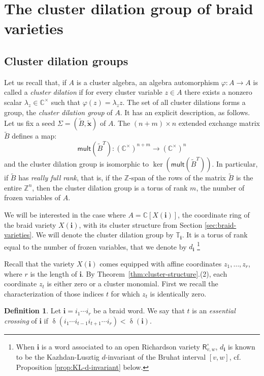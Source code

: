 \documentclass[a4paper, 11pt]{amsart}
\newcommand{\seed}{\Sigma}
\newcommand{\orich}[1]{\mathsf{R}^{\circ}_{#1}}
\newcommand{\word}[1]{\mathbf{#1}}
\DeclareMathOperator{\dem}{\delta}
\newcommand{\C}{\mathbb{C}}
\newcommand{\Z}{\mathbb{Z}}
\newcommand{\dil}[1]{\mathbb{T}_{#1}}
\newcommand{\frozen}[1]{d_{#1}}
\theoremstyle{definition}
\newtheorem{definition}[theorem]{Definition}
\begin{document}
\section{The cluster dilation group of braid varieties}\label{sec:cluster-dilation-braid}

\subsection{Cluster dilation groups} Let us recall that, if $A$ is a cluster algebra, an algebra automorphism $\varphi: A \to A$ is called a \emph{cluster dilation} if for every cluster variable $z \in A$ there exists a nonzero scalar $\lambda_z \in \C^{\times}$ such that $\varphi(z) = \lambda_z z$. The set of all cluster dilations forms a group, the \emph{cluster dilation group} of $A$. It has an explicit description, as follows. Let us fix a seed $\seed = (\widetilde{B}, \widetilde{\mathbf{x}})$ of $A$. The $(n+m) \times n$ extended exchange matrix $\widetilde{B}$ defines a map:
\[
\mathsf{mult}(\widetilde{B}^{T}): (\C^{\times})^{n+m} \to (\C^{\times})^n
\]
and the cluster dilation group is isomorphic to $\ker(\mathsf{mult}(\widetilde{B}^{T}))$. In particular, if $\widetilde{B}$ has \emph{really full rank}, that is, if the $\Z$-span of the rows of the matrix $\widetilde{B}$ is the entire $\Z^n$,  then the cluster dilation group is a torus of rank $m$, the number of frozen variables of $A$.

We will be interested in the case where $A = \C[X(\word{i})]$, the coordinate ring of the braid variety $X(\word{i})$, with its cluster structure from Section \ref{sec:braid-varieties}. We will denote the cluster dilation group by $\dil{\word{i}}$. It is a torus of rank equal to the number of frozen variables, that we denote by $\frozen{\word{i}}$ \footnote{When $\word{i}$ is a word associated to an open Richardson variety $\orich{v,w}$, $\frozen{\word{i}}$ is known to be the Kazhdan-Lusztig $d$-invariant of the Bruhat interval $[v, w]$, cf. Proposition \ref{prop:KL-d-invariant} below.}

Recall that the variety $X(\word{i})$ comes equipped with affine coordinates $z_1, \dots, z_r$, where $r$ is the length of $\word{i}$. By Theorem~\ref{thm:cluster-structure}.(2), each coordinate $z_t$ is either zero or a cluster monomial. First we recall the characterization of those indices $t$  for which $z_t$ is identically zero. 

\begin{definition}
    Let $\word{i} = i_1\cdots i_r$ be a braid word. We say that $t$ is an {\it essential crossing} of $\word{i}$ if $\dem(i_1\cdots {i_{t-1}i_{t+1}\cdots i_r}) < \dem(\word{i})$. 
\end{definition}
\end{document}
